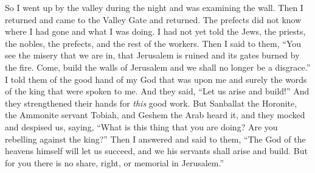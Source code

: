 \begin{biblechapter}
\verse So I went up by the valley during the night and was examining the wall. Then I returned and came to the Valley Gate and returned.
\verse The prefects did not know where I had gone and what I was doing. I had not yet told the Jews, the priests, the nobles, the prefects, and the rest of the workers.
\verse Then I said to them, “You see the misery that we are in, that Jerusalem is ruined and its gates burned by the fire. Come, build the walls of Jerusalem and we shall no longer be a disgrace.”
\verse I told them of the good hand of my God that was upon me and surely the words of the king that were spoken to me. And they said, “Let us arise and build!” And they strengthened their hands for \textit{this} good work.
\verse But Sanballat the Horonite, the Ammonite servant Tobiah, and Geshem the Arab heard it, and they mocked and despised us, saying, “What is this thing that you are doing? Are you rebelling against the king?”
\verse Then I answered and said to them, “The God of the heavens himself will let us succeed, and we his servants shall arise and build. But for you there is no share, right, or memorial in Jerusalem.”
\end{biblechapter}

